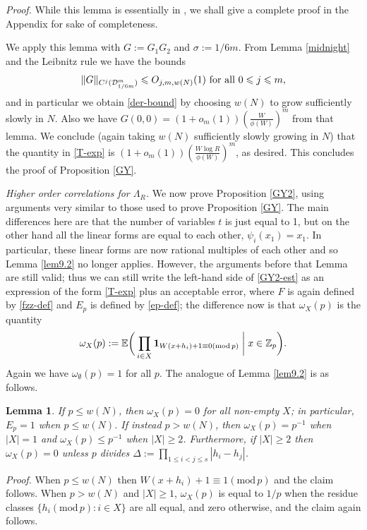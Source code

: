 \documentclass[12pt,a4paper,reqno]{amsart}
\numberwithin{equation}{section}
\theoremstyle{plain}
\newtheorem{lemma}[subsection]{Lemma}
\theoremstyle{definition}
\renewcommand{\leq}{\leqslant}
\renewcommand{\geq}{\geqslant}
\newcommand{\md}[1]{\ensuremath{(\mbox{mod}\, #1)}}
\newcommand{\mdsub}[1]{\ensuremath{(\mbox{\scriptsize mod}\, #1)}}
\def\D{{\mathcal D}}
\def\Z{{\mathbb Z}}
\def\E{{\mathbb E}}
\def\w{w}
\def\ni{\noindent}
\def\proof{\noindent\textit{Proof. }}
\def\endproof{\hfill{\usebox{\proofbox}}}
\begin{document}
\proof While this lemma is essentially in \cite{goldston-yildirim}, we shall give a complete proof in the Appendix
for sake of completeness. \endproof\vspace{11pt}

\ni We apply this lemma with $G := G_1 G_2$ and $\sigma := 1/6m$.  From Lemma \ref{midnight} and the Leibnitz rule we have the bounds
$$ \| G \|_{C^j(\D^m_{1/6m})} \leq O_{j,m,\w(N)}(1) \hbox{ for all } 0 \leq j \leq m,$$
and in particular we obtain \eqref{der-bound} by choosing $\w(N)$ to grow sufficiently slowly in $N$.  Also we have
$G(0,0) = (1 + o_m(1)) (\frac{W}{\phi(W)})^m$ from that lemma.  We conclude 
(again taking $\w(N)$ sufficiently slowly growing in $N$) 
that the quantity in \eqref{T-exp}
is $(1 + o_m(1)) (\frac{W \log R}{\phi(W)})^m$, as desired. 
This concludes the proof of Proposition \ref{GY}. \endproof\vspace{11pt}

\noindent\textit{Higher order correlations for $\Lambda_R$.}
We now prove Proposition \ref{GY2}, using arguments very similar to those used to prove
Proposition \ref{GY}.  The main differences
here are that the number of variables $t$ is just equal to 1, but on
the other hand all the linear forms are equal to each other, 
$\psi_i(x_1) = x_1$.  In particular, these linear forms are now rational
multiples of each other and so Lemma  \ref{lem9.2} no longer applies.
However, the arguments before that Lemma are still valid; thus
we can still write the left-hand side of \eqref{GY2-est} as
an expression of the form \eqref{T-exp} plus an acceptable error,
where $F$ is again defined by \eqref{fzz-def} and $E_p$ is defined by
\eqref{ep-def}; the difference now is that $\omega_X(p)$ is the quantity
\[ \omega_X(p) := \E\bigg( \prod_{i \in X} {\bf 1}_{W(x + h_i) + 1 \equiv 0 \mdsub{p}} \; \bigg| \; x \in \Z_p \bigg).\]
Again we have $\omega_\emptyset(p) = 1$ for all $p$.  The analogue of Lemma
\ref{lem9.2} is as follows.

\begin{lemma}\label{omega2-lem}  
If $p \leq \w(N)$, then $\omega_X(p) = 0$ for all non-empty $X$; in particular, $E_p = 1$ when
$p \leq \w(N)$.  If instead $p > \w(N)$, then $\omega_X(p) = p^{-1}$ when 
$|X|=1$ and $\omega_X(p) \leq p^{-1}$ when $|X| \geq 2$. Furthermore, if $|X| \geq 2$ then $\omega_X(p) = 0$ unless $p$ divides $\Delta := \prod_{1 \leq i < j \leq s} |h_i-h_j|$.
\end{lemma}

\begin{proof} When $p \leq \w(N)$ then $W(x+h_i)+1 \equiv 1 \md{p}$ and the claim
follows.  When $p > \w(N)$ and $|X| \geq 1$, 
$\omega_X(p)$ is equal to $1/p$ when the residue classes 
$\{ h_i \md{p}: i \in X \}$ are all equal, and zero otherwise, and the
claim again follows.
\end{proof}
\end{document}
